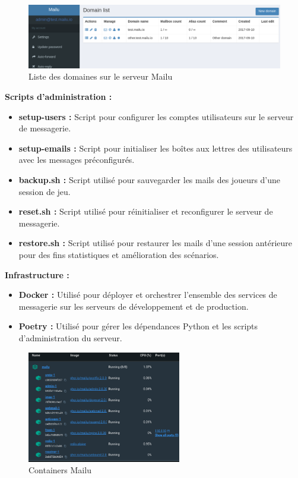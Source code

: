 \begin{figure}[h]
	\center
	\includegraphics[width=\textwidth]{./images/domains_mailu.png}
	\caption[Domaines du serveur Mailu]{Liste des domaines sur le serveur Mailu}\label{fig:domains_mailu}
\end{figure}

\noindent\textbf{Scripts d'administration :}
\begin{itemize}
	\item \textbf{setup-users :} Script pour configurer les comptes utilisateurs sur le serveur de messagerie.
	\item \textbf{setup-emails :} Script pour initialiser les boîtes aux lettres des utilisateurs avec les messages préconfigurés.
	\item \textbf{backup.sh :} Script utilisé pour sauvegarder les mails des joueurs d'une session de jeu.
	\item \textbf{reset.sh :} Script utilisé pour réinitialiser et reconfigurer le serveur de messagerie.
	\item \textbf{restore.sh :} Script utilisé pour restaurer les mails d'une session antérieure pour des fins statistiques et amélioration des scénarios.
\end{itemize}

\noindent\textbf{Infrastructure :}
\begin{itemize}
	\item \textbf{Docker :} Utilisé pour déployer et orchestrer l'ensemble des services de messagerie sur les serveurs de développement et de production.
	\item \textbf{Poetry :} Utilisé pour gérer les dépendances Python et les scripts d'administration du serveur.
\end{itemize}

\begin{figure}[h]
	\center
	\includegraphics[width=0.6\textwidth]{./images/docker_mpc.png}
	\caption[Liste des conteneurs de Mailu]{Containers Mailu}\label{fig:docker_mpc}
\end{figure}


